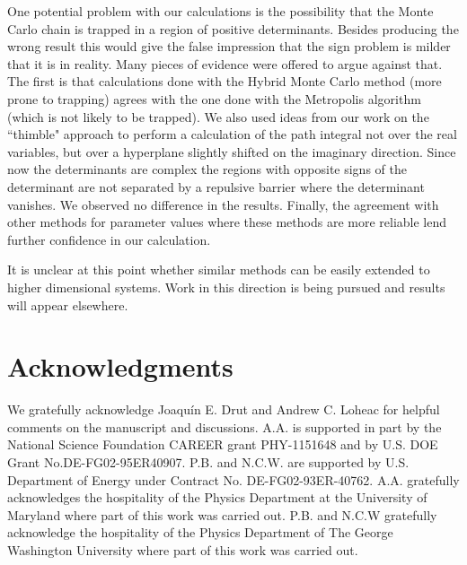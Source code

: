 \documentclass[aps,eqsecnum,amsmath,onecolumn,groupedaddress,superscriptaddress,notitlepage,nofootinbib]{revtex4-1}
\begin{document}
One potential problem with our calculations is the possibility that the Monte Carlo chain is trapped in a region of positive determinants. Besides producing the wrong result this would give the false impression that the sign problem is milder that it is in reality. Many pieces of evidence were offered to argue against that. The first is that calculations done with the Hybrid Monte Carlo method (more prone to trapping) agrees with the one done with the Metropolis algorithm (which is not likely to be trapped). We also used ideas from our work on the ``thimble" approach to perform a calculation of the path integral not over the real variables, but over a hyperplane slightly shifted on the imaginary direction. Since now the determinants are complex the regions with opposite signs of the determinant are not separated by a repulsive barrier where the determinant vanishes. We observed no difference in the results. Finally, the agreement with other methods for parameter values where these methods are more reliable lend further confidence in our calculation.

It is unclear at this point whether similar methods can be easily extended to higher dimensional systems. Work in this direction is being pursued and results will appear elsewhere.

%
%
%
%


\section{Acknowledgments}
We gratefully acknowledge Joaqu\'{i}n E. Drut and Andrew C. Loheac for helpful comments on the manuscript and discussions. A.A. is supported in part by the National Science Foundation CAREER grant PHY-1151648 and by U.S. DOE Grant No.DE-FG02-95ER40907.  P.B. and N.C.W. are supported by U.S. Department of Energy under Contract No. DE-FG02-93ER-40762. A.A. gratefully acknowledges the hospitality of the Physics Department at the University of Maryland where part of this work was carried out. P.B. and N.C.W gratefully acknowledge the hospitality of the Physics Department of The George Washington University where part of this work was carried out.  



\end{document}

